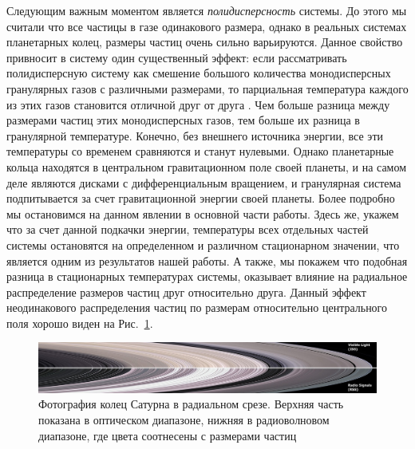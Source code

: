 Следующим важным моментом является \emph{полидисперсность} системы. До этого мы считали что все частицы в газе одинакового размера, однако в реальных
системах планетарных колец, размеры частиц очень сильно варьируются. Данное свойство привносит в систему один существенный эффект: если рассматривать
полидисперсную систему как смешение большого количества монодисперсных гранулярных газов с различными размерами, то парциальная температура каждого
из этих газов становится отличной друг от друга \cite{Uecker:2009pre_part_energy,Garzo:1999pre_gran_mixture,Garzo:2007pre_enskog_I,
Garzo:2007pre_enskog_II, Barrat:2002gm_binary_mix,Bodrova:2014epl_steep_distr}. 
Чем больше разница между размерами частиц этих монодисперсных газов, тем больше их разница в
гранулярной температуре. Конечно, без внешнего источника энергии, все эти температуры со временем сравняются и станут нулевыми. Однако планетарные
кольца находятся в центральном гравитационном поле своей планеты, и на самом деле являются дисками с дифференциальным вращением, и гранулярная система
подпитывается за счет гравитационной энергии своей планеты. Более подробно мы остановимся на данном явлении в основной части работы. Здесь же,
укажем что за счет данной подкачки энергии, температуры всех отдельных частей системы остановятся на определенном и различном стационарном значении, 
что является одним из результатов нашей работы. А также, мы покажем что подобная разница в стационарных температурах системы, оказывает влияние
на радиальное распределение размеров частиц друг относительно друга. Данный эффект неодинакового распределения частиц по размерам относительно
центрального поля хорошо виден на Рис.~\ref{fig:cassini_rings_radial_sizes}.

\begin{figure}[ht]
    \centering
    \includegraphics[width=\textwidth]{figures/1800px-Saturn's_rings_in_visible_light_and_radio.jpg}
    \caption{Фотография колец Сатурна в радиальном срезе. Верхняя часть показана в оптическом диапазоне, нижняя в радиоволновом диапазоне, 
    где цвета соотнесены с размерами частиц}
    \label{fig:cassini_rings_radial_sizes}
\end{figure}